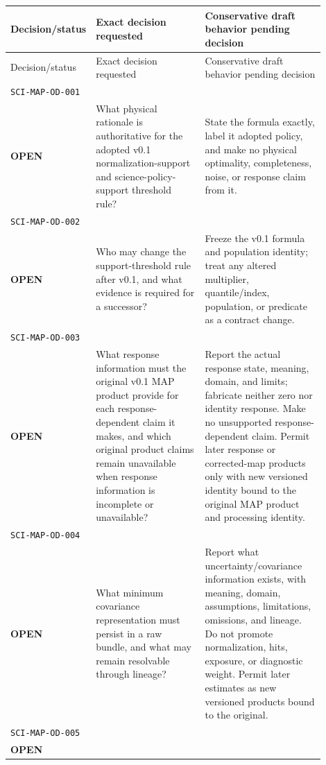 \begingroup
\small
\setlength{\tabcolsep}{4pt}
\begin{longtable}{L{0.14\linewidth}L{0.37\linewidth}L{0.39\linewidth}}
\toprule
Decision/status & Exact decision requested & Conservative draft behavior pending decision\\
\midrule
\endfirsthead
\toprule
Decision/status & Exact decision requested & Conservative draft behavior pending decision\\
\midrule
\endhead
\texttt{SCI-MAP-OD-001}\\\textbf{OPEN} &
What physical rationale is authoritative for the adopted v0.1 normalization-support and science-policy-support threshold rule? &
State the formula exactly, label it adopted policy, and make no physical optimality, completeness, noise, or response claim from it.\\
\addlinespace[0.35em]
\texttt{SCI-MAP-OD-002}\\\textbf{OPEN} &
Who may change the support-threshold rule after v0.1, and what evidence is required for a successor? &
Freeze the v0.1 formula and population identity; treat any altered multiplier, quantile/index, population, or predicate as a contract change.\\
\addlinespace[0.35em]
\texttt{SCI-MAP-OD-003}\\\textbf{OPEN} &
What response information must the original v0.1 MAP product provide for each response-dependent claim it makes, and which original product claims remain unavailable when response information is incomplete or unavailable? &
Report the actual response state, meaning, domain, and limits; fabricate neither zero nor identity response. Make no unsupported response-dependent claim. Permit later response or corrected-map products only with new versioned identity bound to the original MAP product and processing identity.\\
\addlinespace[0.35em]
\texttt{SCI-MAP-OD-004}\\\textbf{OPEN} &
What minimum covariance representation must persist in a raw bundle, and what may remain resolvable through lineage? &
Report what uncertainty/covariance information exists, with meaning, domain, assumptions, limitations, omissions, and lineage. Do not promote normalization, hits, exposure, or diagnostic weight. Permit later estimates as new versioned products bound to the original.\\
\addlinespace[0.35em]
\texttt{SCI-MAP-OD-005}\\\textbf{OPEN} &

\end{longtable}
